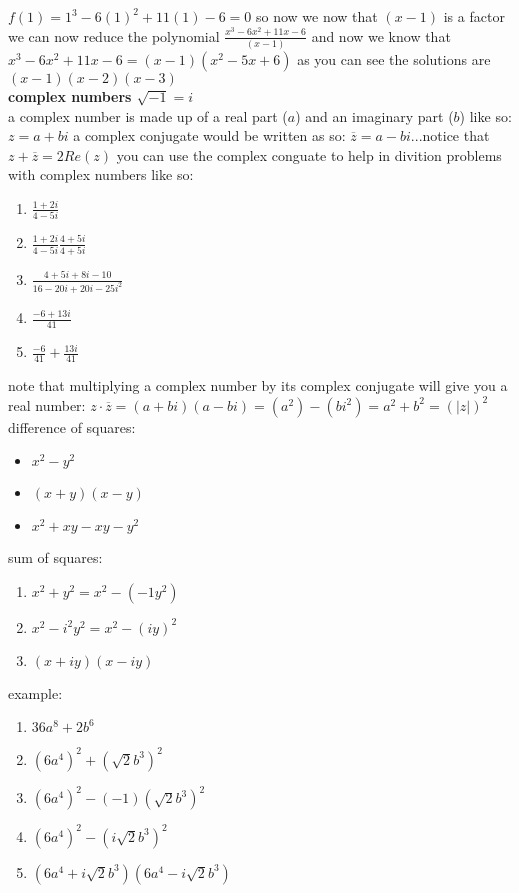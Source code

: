 \documentclass{article}
\begin{document}
$f(1) = 1^3 - 6(1)^2 + 11(1) - 6 = 0$ so now we now that $(x - 1)$ is a factor\\
we can now reduce the polynomial $\frac{x^3 - 6x^2 + 11x - 6}{(x - 1)}$ and now we know that $x^3 - 6x^2 + 11x - 6 = (x - 1)(x^2 - 5x + 6)$ as you can see the solutions are $(x - 1)(x - 2)(x - 3)$\\


\textbf{complex numbers $\sqrt{-1} = i$}\\

a complex number is made up of a real part ($a$) and an imaginary part ($b$) like so: $z = a + bi$ a complex conjugate would be written as so: $\overline{z} = a - bi$...notice that $z + \overline{z} = 2Re(z)$ you can use the complex conguate to help in divition problems with complex numbers like so:
	\begin{enumerate}
		\item $\frac{1 + 2i}{4 - 5i}$
		\item $\frac{1 + 2i}{4 - 5i}\frac{4 + 5i}{4 + 5i}$
		\item $\frac{4 + 5i + 8i - 10}{16 - 20i + 20i - 25i^2}$
		\item $\frac{-6 + 13i}{41}$
		\item $\frac{-6}{41} + \frac{13i}{41}$	
	\end{enumerate}

note that multiplying a complex number by its complex conjugate will give you a real number: $z \cdot \overline{z} = (a + bi)(a - bi) = (a^2) - (bi^2) = a^2 + b^2 = (\lvert z \rvert)^2$\\

difference of squares:
	\begin{itemize}
		\item $x^2 - y^2$
		\item $(x + y)(x - y)$
		\item $x^2 + xy -xy - y^2$
	\end{itemize}

sum of squares:
	\begin{enumerate}
		\item $x^2 + y^2 = x^2 - (-1y^2)$
		\item $x^2 - i^2y^2 = x^2 - (iy)^2$
		\item $(x + iy)(x - iy)$
	\end{enumerate}

example:
	\begin{enumerate}
		\item $36a^8 + 2b^6$
		\item $(6a^4)^2 + (\sqrt{2}b^3)^2$
		\item $(6a^4)^2 - (-1)(\sqrt{2}b^3)^2$
		\item $(6a^4)^2 - (i\sqrt{2}b^3)^2$
		\item $(6a^4 + i\sqrt{2}b^3)(6a^4 - i\sqrt{2}b^3)$
	\end{enumerate}
\end{document}
